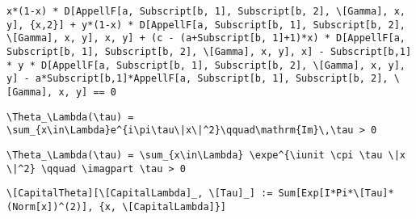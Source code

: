 \newsavebox\CNMM
\begin{lrbox}{\CNMM}
 \begin{minipage}[t]{0.82\textwidth}
  \lstinline[language={[latex]TeX},mathescape,breaklines=true]"x*(1-x) * D[AppellF[a, Subscript[b, 1], Subscript[b, 2], \[Gamma], x, y], {x,2}] + y*(1-x) * D[AppellF[a, Subscript[b, 1], Subscript[b, 2], \[Gamma], x, y], x, y] + (c - (a+Subscript[b, 1]+1)*x) * D[AppellF[a, Subscript[b, 1], Subscript[b, 2], \[Gamma], x, y], x] - Subscript[b,1] * y * D[AppellF[a, Subscript[b, 1], Subscript[b, 2], \[Gamma], x, y], y] - a*Subscript[b,1]*AppellF[a, Subscript[b, 1], Subscript[b, 2], \[Gamma], x, y] == 0"
 \end{minipage}
\end{lrbox}
\newsavebox\CNMA
\begin{lrbox}{\CNMA}
 \begin{minipage}[t]{0.82\textwidth}
  \lstinline[language={[latex]TeX},mathescape,breaklines=true]""
 \end{minipage}
\end{lrbox}
\newsavebox\COT
\begin{lrbox}{\COT}
 \begin{minipage}[t]{0.82\textwidth}
  \lstinline[language={[latex]TeX},mathescape,breaklines=true]"\Theta_\Lambda(\tau) = \sum_{x\in\Lambda}e^{i\pi\tau\|x\|^2}\qquad\mathrm{Im}\,\tau > 0"
 \end{minipage}
\end{lrbox}
\newsavebox\COST
\begin{lrbox}{\COST}
 \begin{minipage}[t]{0.82\textwidth}
  \lstinline[language={[latex]TeX},mathescape,breaklines=true]"\Theta_\Lambda(\tau) = \sum_{x\in\Lambda} \expe^{\iunit \cpi \tau \|x \|^2} \qquad \imagpart \tau > 0"
 \end{minipage}
\end{lrbox}
\newsavebox\COMM
\begin{lrbox}{\COMM}
 \begin{minipage}[t]{0.82\textwidth}
  \lstinline[language={[latex]TeX},mathescape,breaklines=true]"\[CapitalTheta][\[CapitalLambda]_, \[Tau]_] := Sum[Exp[I*Pi*\[Tau]*(Norm[x])^(2)], {x, \[CapitalLambda]}]"
 \end{minipage}
\end{lrbox}
\newsavebox\COMA
\begin{lrbox}{\COMA}
 \begin{minipage}[t]{0.82\textwidth}
  \lstinline[language={[latex]TeX},mathescape,breaklines=true]""
 \end{minipage}
\end{lrbox}
